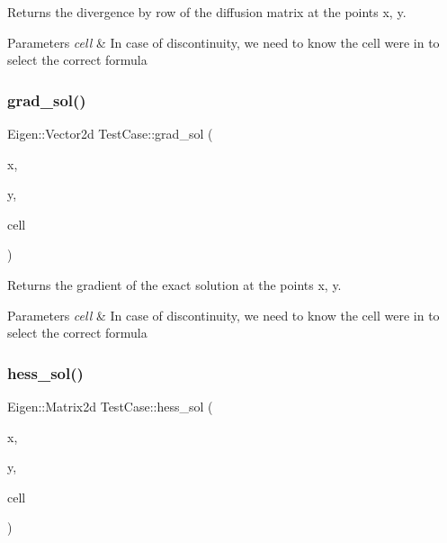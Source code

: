 Returns the divergence by row of the diffusion matrix at the points x, y. 


\begin{DoxyParams}{Parameters}
{\em cell} & In case of discontinuity, we need to know the cell we\textquotesingle{}re in to select the correct formula \\
\hline
\end{DoxyParams}
\mbox{\label{classTestCase_a2e3004705b74b232dc54d84652ec88ae}} 
\subsubsection{\texorpdfstring{grad\+\_\+sol()}{grad\_sol()}}
{\footnotesize\ttfamily Eigen\+::\+Vector2d Test\+Case\+::grad\+\_\+sol (\begin{DoxyParamCaption}\item[{const double}]{x,  }\item[{const double}]{y,  }\item[{const \hyperlink{classHArDCore2D_1_1Cell}{Cell} $\ast$}]{cell }\end{DoxyParamCaption})}



Returns the gradient of the exact solution at the points x, y. 


\begin{DoxyParams}{Parameters}
{\em cell} & In case of discontinuity, we need to know the cell we\textquotesingle{}re in to select the correct formula \\
\hline
\end{DoxyParams}
\mbox{\label{classTestCase_aadf1375364b34ad3b9fa651eae5baa1e}} 
\subsubsection{\texorpdfstring{hess\+\_\+sol()}{hess\_sol()}}
{\footnotesize\ttfamily Eigen\+::\+Matrix2d Test\+Case\+::hess\+\_\+sol (\begin{DoxyParamCaption}\item[{const double}]{x,  }\item[{const double}]{y,  }\item[{const \hyperlink{classHArDCore2D_1_1Cell}{Cell} $\ast$}]{cell }\end{DoxyParamCaption})}



